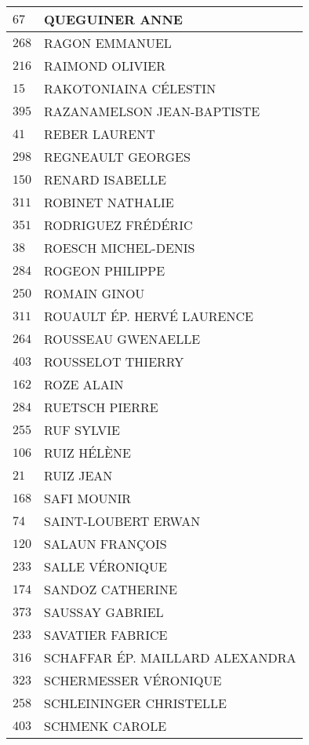 \begin{xltabular}{\linewidth}{|l|X|}
    \hline
    $67$ & QUEGUINER ANNE \\
    \hline
    $268$ & RAGON EMMANUEL \\
    \hline
    $216$ & RAIMOND OLIVIER \\
    \hline
    $15$ & RAKOTONIAINA CÉLESTIN \\
    \hline
    $395$ & RAZANAMELSON JEAN-BAPTISTE \\
    \hline
    $41$ & REBER LAURENT \\
    \hline
    $298$ & REGNEAULT GEORGES \\
    \hline
    $150$ & RENARD ISABELLE \\
    \hline
    $311$ & ROBINET NATHALIE \\
    \hline
    $351$ & RODRIGUEZ FRÉDÉRIC \\
    \hline
    $38$ & ROESCH MICHEL-DENIS \\
    \hline
    $284$ & ROGEON PHILIPPE \\
    \hline
    $250$ & ROMAIN GINOU \\
    \hline
    $311$ & ROUAULT ÉP. HERVÉ LAURENCE \\
    \hline
    $264$ & ROUSSEAU GWENAELLE \\
    \hline
    $403$ & ROUSSELOT THIERRY \\
    \hline
    $162$ & ROZE ALAIN \\
    \hline
    $284$ & RUETSCH PIERRE \\
    \hline
    $255$ & RUF SYLVIE \\
    \hline
    $106$ & RUIZ HÉLÈNE \\
    \hline
    $21$ & RUIZ JEAN \\
    \hline
    $168$ & SAFI MOUNIR \\
    \hline
    $74$ & SAINT-LOUBERT ERWAN \\
    \hline
    $120$ & SALAUN FRANÇOIS \\
    \hline
    $233$ & SALLE VÉRONIQUE \\
    \hline
    $174$ & SANDOZ CATHERINE \\
    \hline
    $373$ & SAUSSAY GABRIEL \\
    \hline
    $233$ & SAVATIER FABRICE \\
    \hline
    $316$ & SCHAFFAR ÉP. MAILLARD ALEXANDRA \\
    \hline
    $323$ & SCHERMESSER VÉRONIQUE \\
    \hline
    $258$ & SCHLEININGER CHRISTELLE \\
    \hline
    $403$ & SCHMENK CAROLE \\

\end{xltabular}
